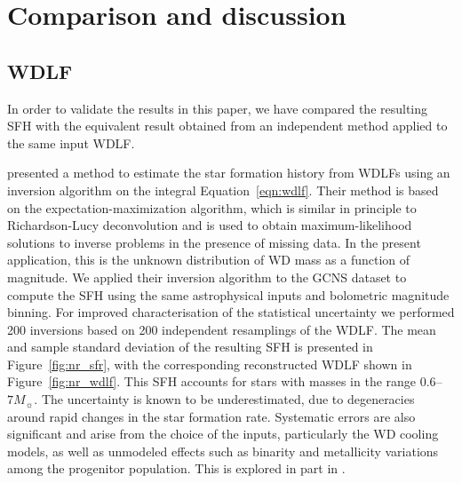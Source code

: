 \documentclass[fleqn,usenatbib]{mnras}
\begin{document}
\section{Comparison and discussion}
\label{sec:comparison}

\subsection{WDLF}
\label{sec:inversion}
In order to validate the results in this paper, we have compared the
resulting SFH with the equivalent result obtained from an
independent method applied to the same input WDLF.

\citet{2013MNRAS.434.1549R} presented a method to estimate the star formation
history from WDLFs using an inversion algorithm on the integral 
Equation~\ref{eqn:wdlf}. Their method is based on the expectation-maximization
algorithm, which is similar in principle to Richardson-Lucy deconvolution and is
used to obtain maximum-likelihood solutions to inverse problems in the presence 
of missing data. In the present application, this is the unknown distribution
of WD mass as a function of magnitude.
\textcolor{nick}{
We applied their inversion algorithm to the GCNS dataset to compute the SFH using
the same astrophysical inputs and bolometric magnitude binning. For improved
characterisation of the statistical uncertainty we performed 200 inversions based
on 200 independent resamplings of the WDLF. The mean and sample standard deviation
of the resulting SFH is presented in Figure~\ref{fig:nr_sfr}, with the
corresponding reconstructed WDLF shown in Figure~\ref{fig:nr_wdlf}. This SFH
accounts for stars with masses in the range $0.6$--$7 M_{\sun}$.
%
The uncertainty is known to be underestimated, due to degeneracies around rapid
changes in the star formation rate. Systematic errors are also significant and arise
from the choice of the inputs, particularly the WD cooling models, as well as
unmodeled effects such as binarity and metallicity variations among the progenitor
population. This is explored in part in \citet{2013MNRAS.434.1549R}.}
\end{document}
